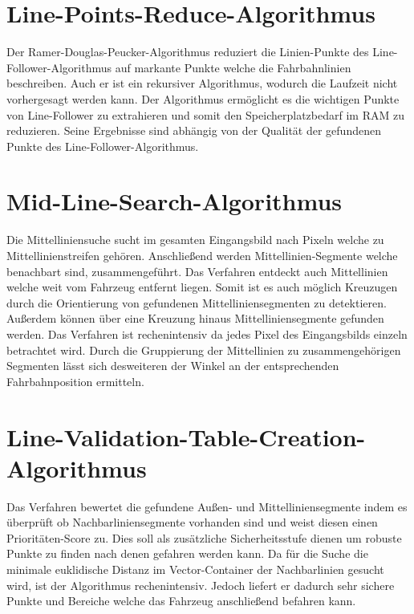 \section{Line-Points-Reduce-Algorithmus}
\label{section:Line-Points-Reduce-Algorithmus}

Der Ramer-Douglas-Peucker-Algorithmus reduziert die Linien-Punkte des Line-Follower-Algorithmus auf markante Punkte welche die Fahrbahnlinien beschreiben. Auch er ist ein rekursiver Algorithmus, wodurch die Laufzeit nicht vorhergesagt werden kann. Der Algorithmus erm\"oglicht es die wichtigen Punkte von Line-Follower zu extrahieren und somit den Speicherplatzbedarf im RAM zu reduzieren. Seine Ergebnisse sind abh\"angig von der Qualit\"at der gefundenen Punkte des Line-Follower-Algorithmus. 

\section{Mid-Line-Search-Algorithmus}
\label{section:Mid-Line-Search-Algorithmus}
Die Mittelliniensuche sucht im gesamten Eingangsbild nach Pixeln welche zu Mittellinienstreifen geh\"oren. Anschlie{\ss}end werden Mittellinien-Segmente welche benachbart sind, zusammengef\"uhrt. Das Verfahren entdeckt auch Mittellinien welche weit vom Fahrzeug entfernt liegen. Somit ist es auch m\"oglich Kreuzugen durch die Orientierung von gefundenen Mittelliniensegmenten zu detektieren. Au{\ss}erdem k\"onnen \"uber eine Kreuzung hinaus Mittelliniensegmente gefunden werden. Das Verfahren ist rechenintensiv da jedes Pixel des Eingangsbilds einzeln betrachtet wird. Durch die Gruppierung der Mittellinien zu zusammengeh\"origen Segmenten l\"asst sich desweiteren der Winkel an der entsprechenden Fahrbahnposition ermitteln.

\section{Line-Validation-Table-Creation-Algorithmus}
\label{section:Line-Validation-Table-Creation-Algorithmus}

Das Verfahren bewertet die gefundene Au{\ss}en- und Mittelliniensegmente indem es \"uberpr\"uft ob Nachbarliniensegmente vorhanden sind und weist diesen einen Priorit{\"a}ten-Score zu. Dies soll als zus\"atzliche Sicherheitsstufe dienen um robuste Punkte zu finden nach denen gefahren werden kann. Da f{\"u}r die Suche die minimale euklidische Distanz im Vector-Container der Nachbarlinien gesucht wird, ist der Algorithmus rechenintensiv. Jedoch liefert er dadurch sehr sichere Punkte und Bereiche welche das Fahrzeug anschlie{\ss}end befahren kann.  

